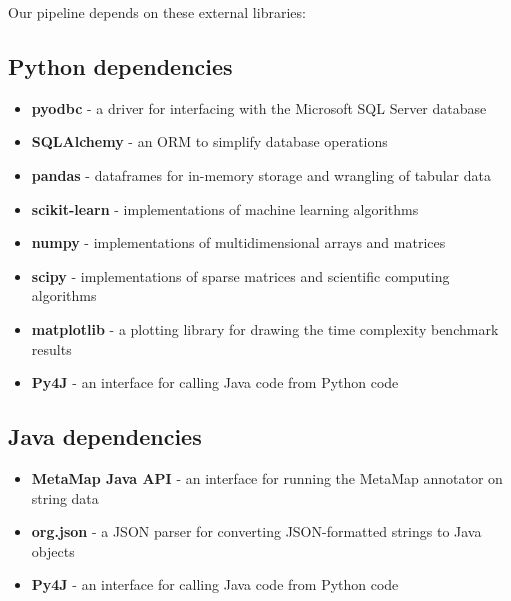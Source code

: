 \documentclass[a4paper]{article}
\begin{document}
Our pipeline depends on these external libraries:

\subsection{Python dependencies}

\begin{itemize}
\item \textbf{pyodbc} - a driver for interfacing with the Microsoft SQL Server database
\item \textbf{SQLAlchemy} - an ORM to simplify database operations
\item \textbf{pandas} - dataframes for in-memory storage and wrangling of tabular data
\item \textbf{scikit-learn} - implementations of machine learning algorithms
\item \textbf{numpy} - implementations of multidimensional arrays and matrices
\item \textbf{scipy} - implementations of sparse matrices and scientific computing algorithms
\item \textbf{matplotlib} - a plotting library for drawing the time complexity benchmark results
\item \textbf{Py4J} - an interface for calling Java code from Python code
\end{itemize}

\subsection{Java dependencies}

\begin{itemize}
\item \textbf{MetaMap Java API} - an interface for running the MetaMap annotator on string data
\item \textbf{org.json} - a JSON parser for converting JSON-formatted strings to Java objects
\item \textbf{Py4J} - an interface for calling Java code from Python code
\end{itemize}
\end{document}
